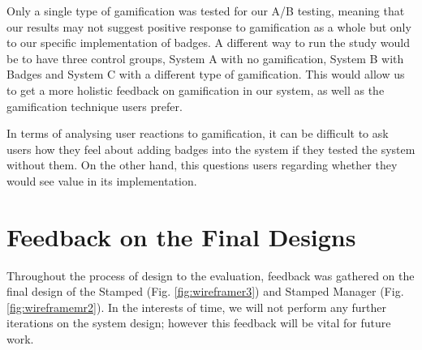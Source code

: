 Only a single type of gamification was tested for our A/B testing, meaning that our results may not suggest positive response to gamification as a whole but only to our specific implementation of badges.  A different way to run the study would be to have three control groups, System A with no gamification, System B with Badges and System C with a different type of gamification. This would allow us to get a more holistic feedback on gamification in our system, as well as the gamification technique users prefer.

In terms of analysing user reactions to gamification, it can be difficult to ask users how they feel about adding badges into the system if they tested the system without them. On the other hand, this questions users regarding whether they would see value in its implementation. %

\section{Feedback on the Final Designs}
Throughout the process of design to the evaluation, feedback was gathered on the final design of the Stamped (Fig. \ref{fig:wireframer3}) and Stamped Manager (Fig. \ref{fig:wireframemr2}). In the interests of time, we will not perform any further iterations on the system design; however this feedback will be vital for future work.
